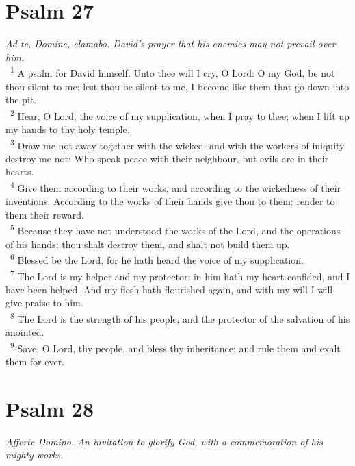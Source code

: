 \documentclass[a5paper,12pt]{article}
\begin{document}
\begin{multicols*}{2}
\section{Psalm 27}
\label{sec:org57fe9e2}
\emph{Ad te, Domine, clamabo. David's prayer that his enemies may not prevail over him.}\\

~\textsuperscript{1} A psalm for David himself. Unto thee will I cry, O Lord: O my God, be not thou silent to me: lest thou be silent to me, I become like them that go down into the pit.\\
~\textsuperscript{2} Hear, O Lord, the voice of my supplication, when I pray to thee; when I lift up my hands to thy holy temple.\\
~\textsuperscript{3} Draw me not away together with the wicked; and with the workers of iniquity destroy me not: Who speak peace with their neighbour, but evils are in their hearts.\\
~\textsuperscript{4} Give them according to their works, and according to the wickedness of their inventions. According to the works of their hands give thou to them: render to them their reward.\\
~\textsuperscript{5} Because they have not understood the works of the Lord, and the operations of his hands: thou shalt destroy them, and shalt not build them up.\\
~\textsuperscript{6} Blessed be the Lord, for he hath heard the voice of my supplication.\\
~\textsuperscript{7} The Lord is my helper and my protector: in him hath my heart confided, and I have been helped. And my flesh hath flourished again, and with my will I will give praise to him.\\
~\textsuperscript{8} The Lord is the strength of his people, and the protector of the salvation of his anointed.\\
~\textsuperscript{9} Save, O Lord, thy people, and bless thy inheritance: and rule them and exalt them for ever.\\

\section{Psalm 28}
\label{sec:org3d10d36}
\emph{Afferte Domino. An invitation to glorify God, with a commemoration of his mighty works.}\\


\end{multicols*}
\end{document}
